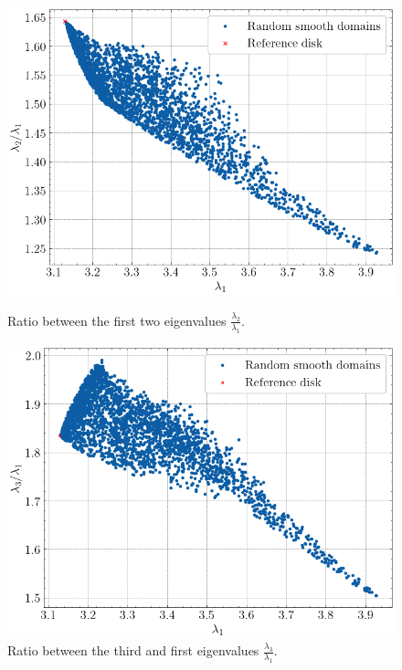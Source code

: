 \begin{figure}[!htb]
    \begin{minipage}[c]{0.45\textwidth}
        \centering
        \includegraphics[width=\textwidth]{Images/Dirac/smooth/smooth_domains_scatter_benguria.png}
        \caption{Ratio between the first two eigenvalues \(\frac{\lambda_2}{\lambda_1}\).}
        \label{dirac_smooth_domains_scatter_benguria}
    \end{minipage}
    \hfill
    \begin{minipage}[c]{0.45\textwidth}
        \centering
        \includegraphics[width=\textwidth]{Images/Dirac/smooth/smooth_domains_scatter_benguria_third.png}
        \caption{Ratio between the third and first eigenvalues \(\frac{\lambda_3}{\lambda_1}\).}
        \label{dirac_smooth_domains_scatter_benguria_third}
    \end{minipage}
\end{figure}


